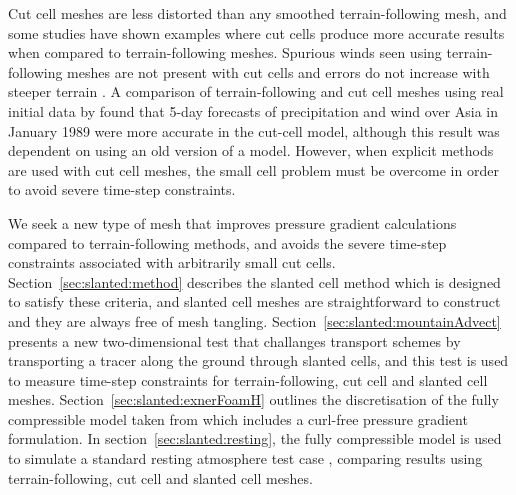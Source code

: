 Cut cell meshes are less distorted than any smoothed terrain-following mesh, and some studies have shown examples where cut cells produce more accurate results when compared to terrain-following meshes.
Spurious winds seen using terrain-following meshes are not present with cut cells and errors do not increase with steeper terrain \citep{good2014}.
A comparison of terrain-following and cut cell meshes using real initial data by \citet{steppeler2013} found that 5-day forecasts of precipitation and wind over Asia in January 1989 were more accurate in the cut-cell model, although this result was dependent on using an old version of a model.
However, when explicit methods are used with cut cell meshes, the small cell problem must be overcome in order to avoid severe time-step constraints.

We seek a new type of mesh that improves pressure gradient calculations compared to terrain-following methods, and avoids the severe time-step constraints associated with arbitrarily small cut cells.  Section~\ref{sec:slanted:method} describes the slanted cell method which is designed to satisfy these criteria, and slanted cell meshes are straightforward to construct and they are always free of mesh tangling.
Section~\ref{sec:slanted:mountainAdvect} presents a new two-dimensional test that challanges transport schemes by transporting a tracer along the ground through slanted cells, and this test is used to measure time-step constraints for terrain-following, cut cell and slanted cell meshes.
Section~\ref{sec:slanted:exnerFoamH} outlines the discretisation of the fully compressible model taken from \citet{weller-shahrokhi2014} which includes a curl-free pressure gradient formulation.  In section~\ref{sec:slanted:resting}, the fully compressible model is used to simulate a standard resting atmosphere test case \citep{klemp2011}, comparing results using terrain-following, cut cell and slanted cell meshes.





